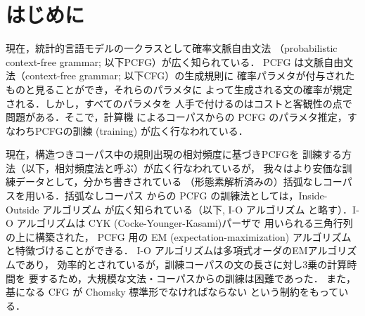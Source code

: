 {

\newcommand{\q}{}
\newcommand{\hq}{}
\newcommand{\iq}{}

\newcommand{\bvec}[1]{}
\newcommand{\sym}[1]{}
\newcommand{\tuple}[1]{}
\newcommand{\defined}{}
\newcommand{\incby}{}
\newcommand{\decby}{}
\newcommand{\mulby}{}
\newcommand{\Vn}{}
\newcommand{\Vt}{}
\newcommand{\dto}{}
\newcommand{\rderives}[1]{}
\newcommand{\derives}{}
\newcommand{\derivesstar}{}
\newcommand{\derivesplus}{}
\newcommand{\win}{}
\newcommand{\rseq}{}
\newcommand{\trees}{}
\newcommand{\treesin}{}
\newcommand{\treesout}{}
\newcommand{\subtrees}{}
\newcommand{\corpus}{}
\newcommand{\labels}{}
\newcommand{\brackets}{}
\newcommand{\Rmax}{}
\newcommand{\wfst}{}
\newcommand{\condrule}[3]{}
\newcommand{\lastrule}{}
\newcommand{\sg}{}  
\newcommand{\subsg}{}  
\newcommand{\occ}{} 
\newcommand{\Gtanaka}{}
\newcommand{\Rtanaka}{}

\newenvironment{listing}{}{}
\newcommand{\itemi}{}
\newcommand{\itemii}{}
\newcommand{\itemiii}{}
\newcommand{\itemiiii}{}
\newcommand{\itemiiiii}{}
\newcommand{\itemiiiiii}{}
\newcommand{\itemiiiiiii}{}
\newcommand{\itemiiiiiiii}{}
\newcommand{\itemiiiiiiiii}{}
\newcommand{\itemiiiiiiiiii}{}
\newcommand{\varinalg}[1]{}
\newcommand{\varP}{}
\newcommand{\varQ}{}
\newcommand{\varR}{}
\newcommand{\varON}{}
\newcommand{\varComp}{}
\newcommand{\varLast}{}
\newcommand{\rw}[1]{}
\newcommand{\proc}[1]{}
\newcommand{\progcomment}[1]{}

\newcommand{\es}[3]{}
\newcommand{\esp}[4]{}
\newcommand{\ip}[3]{}
\newcommand{\op}[3]{}

\section{はじめに}
\label{sec:intro}

現在，統計的言語モデルの一クラスとして確率文脈自由文法
（probabilistic context-free grammar; 以下PCFG）が広く知られている．
PCFG は文脈自由文法（context-free grammar; 以下CFG）の生成規則に
確率パラメタが付与されたものと見ることができ，それらのパラメタに
よって生成される文の確率が規定される．しかし，すべてのパラメタを
人手で付けるのはコストと客観性の点で問題がある．そこで，計算機
によるコーパスからの PCFG のパラメタ推定，すなわちPCFGの訓練
(training) が広く行なわれている．

現在，構造つきコーパス中の規則出現の相対頻度に基づきPCFGを
訓練する方法（以下，相対頻度法と呼ぶ）が広く行なわれているが，
我々はより安価な訓練データとして，分かち書きされている
（形態素解析済みの）括弧なしコーパスを用いる．括弧なしコーパス
からの PCFG の訓練法としては，Inside-Outside アルゴリズム
\cite{Baker79,Lari90} が広く知られている（以下, I-O アルゴリズム
と略す）．I-O アルゴリズムは CYK (Cocke-Younger-Kasami)パーザで
用いられる三角行列の上に構築された，
PCFG 用の EM (expectation-maximization) アルゴリズム
\cite{Dempster77} と特徴づけることができる．
I-O アルゴリズムは多項式オーダのEMアルゴリズムであり，
効率的とされているが，訓練コーパスの文の長さに対し3乗の計算時間を
要するため，大規模な文法・コーパスからの訓練は困難であった．
また，基になる CFG が Chomsky 標準形でなければならない
という制約をもっている．

}
